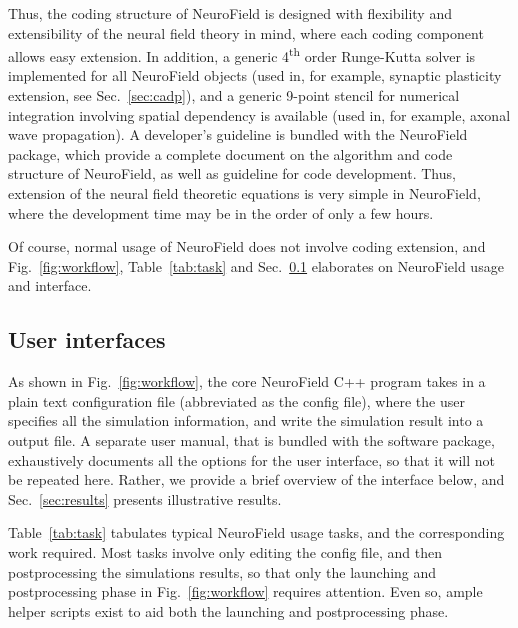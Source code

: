 \documentclass[preprint,review,10pt,authoryear,letterpaper]{elsarticle}
\begin{document}
Thus, the coding structure of NeuroField is designed with flexibility and extensibility of the neural field theory in mind, where each coding component allows easy extension. In addition, a generic 4\textsuperscript{th} order Runge-Kutta solver is implemented for all NeuroField objects (used in, for example, synaptic plasticity extension, see Sec.~\ref{sec:cadp}), and a generic 9-point stencil for numerical integration involving spatial dependency is available (used in, for example, axonal wave propagation). A developer's guideline is bundled with the NeuroField package, which provide a complete document on the algorithm and code structure of NeuroField, as well as guideline for code development. Thus, extension of the neural field theoretic equations is very simple in NeuroField, where the development time may be in the order of only a few hours.

Of course, normal usage of NeuroField does not involve coding extension, and Fig.~\ref{fig:workflow}, Table~\ref{tab:task} and Sec.~\ref{sec:interface} elaborates on NeuroField usage and interface.

\subsection{User interfaces}
\label{sec:interface}

As shown in Fig.~\ref{fig:workflow}, the core NeuroField C++ program takes in a plain text configuration file (abbreviated as the config file), where the user specifies all the simulation information, and write the simulation result into a output file. A separate user manual, that is bundled with the software package, exhaustively documents all the options for the user interface, so that it will not be repeated here. Rather, we provide a brief overview of the interface below, and Sec.~\ref{sec:results} presents illustrative results.

Table~\ref{tab:task} tabulates typical NeuroField usage tasks, and the corresponding work required. Most tasks involve only editing the config file, and then postprocessing the simulations results, so that only the launching and postprocessing phase in Fig.~\ref{fig:workflow} requires attention. Even so, ample helper scripts exist to aid both the launching and postprocessing phase.
\end{document}
